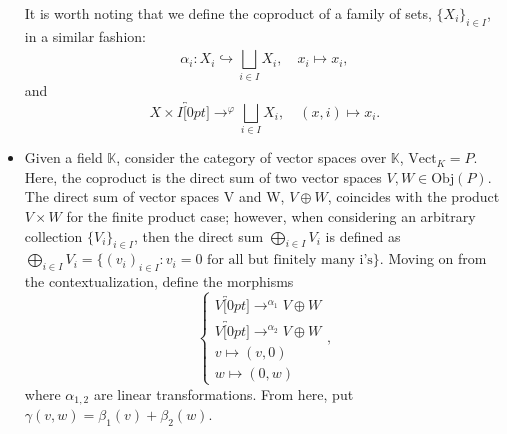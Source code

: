 \documentclass[../category_theory.tex]{subfiles}
\begin{document}
\begin{example}
\begin{itemize}
\begin{center}
\begin{tikzpicture}
			      \end{tikzpicture}
		      \end{center}

		      It is worth noting that we define the coproduct of a family of sets, \(\{X_{i}\}_{i\in I}\), in a similar fashion:
		      \[
			      \alpha_{i}: X_{i}\hookrightarrow \bigsqcup_{i\in I}^{}X_{i},\quad x_{i}\mapsto x_{i},
		      \]
		      and
		      \[
			      X\times I\overbracket[0pt]{\rightarrow}^{\varphi }\bigsqcup_{i\in I}^{}X_{i},\quad (x, i)\mapsto x_{i}.
		      \]
		\item Given a field \(\mathbb{K}\), consider the category of vector spaces over \(\mathbb{K}\), \(\mathrm{Vect}_{K}=P\). Here, the coproduct is the direct sum of two vector spaces \(V, W\in \mathrm{Obj}(P)\). The direct sum of vector spaces V and W, \(V\oplus W\), coincides with the product \(V\times W\) for the finite product case; however, when considering an arbitrary collection \(\{V_{i}\}_{i\in I}\), then the direct sum \(\bigoplus_{i\in I}V_{i}\) is defined as \(\bigoplus_{i\in I}V_{i}=\{(v_{i})_{i\in I}: v_{i}=0\text{ for all but finitely many i's}\}\). Moving on from the contextualization, define the morphisms
		      \[
			      \left\{\begin{array}{ll}
				      V\overbracket[0pt]{\rightarrow}^{\alpha_1} V\oplus W   \\
				      V\overbracket[0pt]{\rightarrow}^{\alpha_{2}} V\oplus W \\
				      v\mapsto (v, 0)                                        \\
				      w\mapsto (0,w)
			      \end{array}\right.,
		      \]
		      where \(\alpha_{1,2}\) are linear transformations. From here, put \(\gamma (v, w)=\beta_1(v)+\beta_2(w)\).
		      \begin{center}
\end{center}
\end{itemize}
\end{example}
\end{document}

